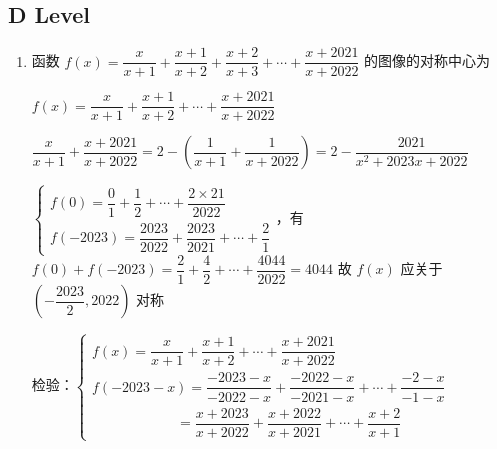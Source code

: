 \subsection*{D Level}
\begin{enumerate}
    \item 函数 $f\left( x\right)  = \dfrac{x}{x + 1} + \dfrac{x + 1}{x + 2} + \dfrac{x + 2}{x + 3} + \cdots  + \dfrac{x + {2021}}{x + {2022}}$ 的图像的对称中心为
    \begin{jieda}
        $f\left( x\right)  = \dfrac{x}{x + 1} + \dfrac{x + 1}{x + 2} + \cdots  + \dfrac{x + {2021}}{x + {2022}}$
        
        $\dfrac{x}{x + 1} + \dfrac{x + {2021}}{x + {2022}} = 2 - \left( {\dfrac{1}{x + 1} + \dfrac{1}{x + {2022}}}\right) = 2 - \dfrac{2021}{{x}^{2} + {2023x} + {2022}}$
        
        $\left\{\begin{array}{l}
             f\left( 0\right)  = \dfrac{0}{1} + \dfrac{1}{2} + \cdots  + \dfrac{2 \times  {21}}{2022}  \\
             f\left( {-{2023}}\right)  = \dfrac{2023}{2022} + \dfrac{2023}{2021} + \cdots  + \dfrac{2}{1} 
        \end{array}\right.$，有$f\left( 0\right)  + f\left( {-{2023}}\right)  = \dfrac{2}{1} + \dfrac{4}{2} + \cdots  + \dfrac{4044}{2022} = {4044}$
        故 $f\left( x\right)$ 应关于 $\left( {-\dfrac{2023}{2},{2022}}\right)$ 对称
        
        
        检验：$\left\{\begin{array}{l}
             f\left( x\right)  = \dfrac{x}{x + 1} + \dfrac{x + 1}{x + 2} + \cdots  + \dfrac{x + {2021}}{x + {2022}}  \\
             f\left( {-{2023} - x}\right)  = \dfrac{-{2023} - x}{-{2022} - x} + \dfrac{-{2022} - x}{-{2021} - x} + \cdots  + \dfrac{-2 - x}{-1 - x} \\ \quad \quad \quad \quad  \quad \quad  = \dfrac{x + {2023}}{x + {2022}} + \dfrac{x + {2022}}{x + {2021}} + \cdots  + \dfrac{x + 2}{x + 1}
        \end{array}\right.$
        

\end{jieda}
\end{enumerate}
